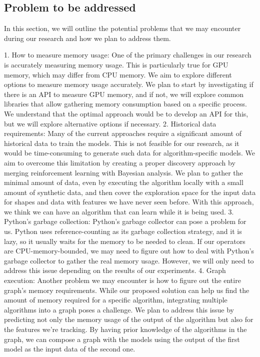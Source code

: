 \subsection{Problem to be addressed}
\label{subsec:problems-to-be-addressed}

In this section, we will outline the potential problems that we may encounter during our research and how we plan to address them.

1. How to measure memory usage:
One of the primary challenges in our research is accurately measuring memory usage. This is particularly true for GPU memory, which may differ from CPU memory. We aim to explore different options to measure memory usage accurately. We plan to start by investigating if there is an API to measure GPU memory, and if not, we will explore common libraries that allow gathering memory consumption based on a specific process. We understand that the optimal approach would be to develop an API for this, but we will explore alternative options if necessary.
2. Historical data requirements:
Many of the current approaches require a significant amount of historical data to train the models. This is not feasible for our research, as it would be time-consuming to generate such data for algorithm-specific models. We aim to overcome this limitation by creating a proper discovery approach by merging reinforcement learning with Bayesian analysis. We plan to gather the minimal amount of data, even by executing the algorithm locally with a small amount of synthetic data, and then cover the exploration space for the input data for shapes and data with features we have never seen before. With this approach, we think we can have an algorithm that can learn while it is being used.
3. Python's garbage collection:
Python's garbage collector can pose a problem for us. Python uses reference-counting as its garbage collection strategy, and it is lazy, so it usually waits for the memory to be needed to clean. If our operators are CPU-memory-bounded, we may need to figure out how to deal with Python's garbage collector to gather the real memory usage. However, we will only need to address this issue depending on the results of our experiments.
4. Graph execution:
Another problem we may encounter is how to figure out the entire graph's memory requirements. While our proposed solution can help us find the amount of memory required for a specific algorithm, integrating multiple algorithms into a graph poses a challenge. We plan to address this issue by predicting not only the memory usage of the output of the algorithm but also for the features we're tracking. By having prior knowledge of the algorithms in the graph, we can compose a graph with the models using the output of the first model as the input data of the second one.

